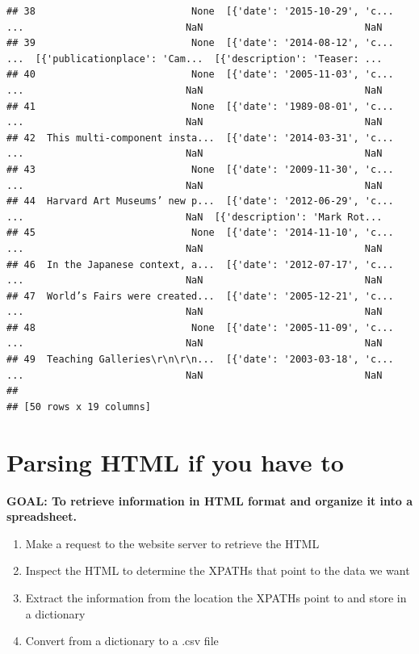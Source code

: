 \documentclass[
]{book}
\providecommand{\tightlist}{%
  \setlength{\itemsep}{0pt}\setlength{\parskip}{0pt}}
\begin{document}
\begin{alert}
\begin{verbatim}
## 38                           None  [{'date': '2015-10-29', 'c...  ...                            NaN                            NaN
## 39                           None  [{'date': '2014-08-12', 'c...  ...  [{'publicationplace': 'Cam...  [{'description': 'Teaser: ...
## 40                           None  [{'date': '2005-11-03', 'c...  ...                            NaN                            NaN
## 41                           None  [{'date': '1989-08-01', 'c...  ...                            NaN                            NaN
## 42  This multi-component insta...  [{'date': '2014-03-31', 'c...  ...                            NaN                            NaN
## 43                           None  [{'date': '2009-11-30', 'c...  ...                            NaN                            NaN
## 44  Harvard Art Museums’ new p...  [{'date': '2012-06-29', 'c...  ...                            NaN  [{'description': 'Mark Rot...
## 45                           None  [{'date': '2014-11-10', 'c...  ...                            NaN                            NaN
## 46  In the Japanese context, a...  [{'date': '2012-07-17', 'c...  ...                            NaN                            NaN
## 47  World’s Fairs were created...  [{'date': '2005-12-21', 'c...  ...                            NaN                            NaN
## 48                           None  [{'date': '2005-11-09', 'c...  ...                            NaN                            NaN
## 49  Teaching Galleries\r\n\r\n...  [{'date': '2003-03-18', 'c...  ...                            NaN                            NaN
## 
## [50 rows x 19 columns]
\end{verbatim}

\end{alert}

\hypertarget{parsing-html-if-you-have-to}{%
\section{Parsing HTML if you have to}\label{parsing-html-if-you-have-to}}

\begin{alert}

\textbf{GOAL: To retrieve information in HTML format and organize it into a spreadsheet.}

\begin{enumerate}
\def\labelenumi{\arabic{enumi}.}
\tightlist
\item
  Make a request to the website server to retrieve the HTML
\item
  Inspect the HTML to determine the XPATHs that point to the data we want
\item
  Extract the information from the location the XPATHs point to and store in a dictionary
\item
  Convert from a dictionary to a .csv file
\end{enumerate}

\end{alert}
\end{document}
